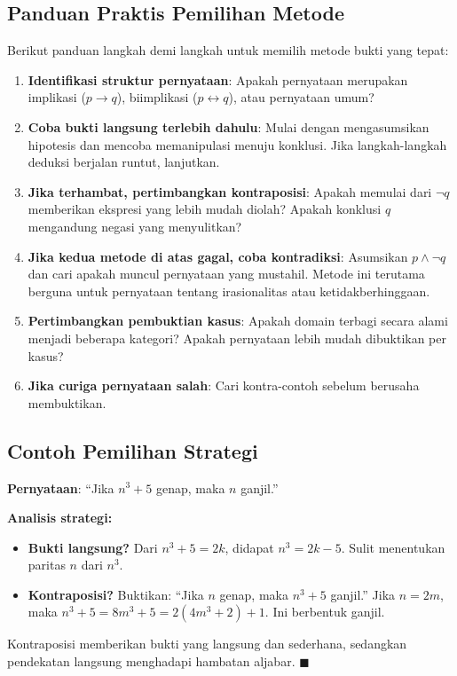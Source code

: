 \subsection{Panduan Praktis Pemilihan Metode}

Berikut panduan langkah demi langkah untuk memilih metode bukti yang tepat:

\begin{enumerate}
  \item \textbf{Identifikasi struktur pernyataan}: Apakah pernyataan merupakan implikasi ($p \rightarrow q$), biimplikasi ($p \leftrightarrow q$), atau pernyataan umum?

  \item \textbf{Coba bukti langsung terlebih dahulu}: Mulai dengan mengasumsikan hipotesis dan mencoba memanipulasi menuju konklusi. Jika langkah-langkah deduksi berjalan runtut, lanjutkan.

  \item \textbf{Jika terhambat, pertimbangkan kontraposisi}: Apakah memulai dari $\neg q$ memberikan ekspresi yang lebih mudah diolah? Apakah konklusi $q$ mengandung negasi yang menyulitkan?

  \item \textbf{Jika kedua metode di atas gagal, coba kontradiksi}: Asumsikan $p \wedge \neg q$ dan cari apakah muncul pernyataan yang mustahil. Metode ini terutama berguna untuk pernyataan tentang irasionalitas atau ketidakberhinggaan.

  \item \textbf{Pertimbangkan pembuktian kasus}: Apakah domain terbagi secara alami menjadi beberapa kategori? Apakah pernyataan lebih mudah dibuktikan per kasus?

  \item \textbf{Jika curiga pernyataan salah}: Cari kontra-contoh sebelum berusaha membuktikan.
\end{enumerate}

\subsection{Contoh Pemilihan Strategi}

\begin{contoh}
\textbf{Pernyataan}: ``Jika $n^3 + 5$ genap, maka $n$ ganjil.''

\textbf{Analisis strategi:}
\begin{itemize}
    \item \textbf{Bukti langsung?} Dari $n^3 + 5 = 2k$, didapat $n^3 = 2k - 5$. Sulit menentukan paritas $n$ dari $n^3$.
    \item \textbf{Kontraposisi?} Buktikan: ``Jika $n$ genap, maka $n^3 + 5$ ganjil.'' Jika $n = 2m$, maka $n^3 + 5 = 8m^3 + 5 = 2(4m^3 + 2) + 1$. Ini berbentuk ganjil. \checkmark
\end{itemize}

Kontraposisi memberikan bukti yang langsung dan sederhana, sedangkan pendekatan langsung menghadapi hambatan aljabar. $\blacksquare$
\end{contoh}

